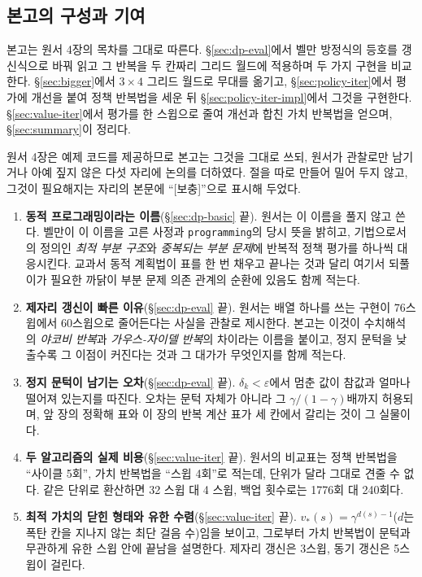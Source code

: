 \documentclass[11pt,a4paper]{article}
\begin{document}
\subsection*{본고의 구성과 기여}

본고는 원서 4장의 목차를 그대로 따른다. \S\ref{sec:dp-eval}에서 벨만 방정식의 등호를 갱신식으로
바꿔 읽고 그 반복을 두 칸짜리 그리드 월드에 적용하며 두 가지 구현을 비교한다.
\S\ref{sec:bigger}에서 $3\times4$ 그리드 월드로 무대를 옮기고, \S\ref{sec:policy-iter}에서 평가에
개선을 붙여 정책 반복법을 세운 뒤 \S\ref{sec:policy-iter-impl}에서 그것을 구현한다.
\S\ref{sec:value-iter}에서 평가를 한 스윕으로 줄여 개선과 합친 가치 반복법을 얻으며,
\S\ref{sec:summary}이 정리다.

원서 4장은 예제 코드를 제공하므로 본고는 그것을 그대로 쓰되, 원서가 관찰로만 남기거나 아예 짚지 않은
다섯 자리에 논의를 더하였다. 절을 따로 만들어 밀어 두지 않고, 그것이 필요해지는 자리의 본문에
``[보충]''으로 표시해 두었다.

\begin{enumerate}[leftmargin=*,itemsep=2pt]
  \item \textbf{동적 프로그래밍이라는 이름}(\S\ref{sec:dp-basic} 끝). 원서는 이 이름을 풀지 않고
        쓴다. 벨만이 이 이름을 고른 사정과 \texttt{programming}의 당시 뜻을 밝히고, 기법으로서의
        정의인 \emph{최적 부분 구조}와 \emph{중복되는 부분 문제}에 반복적 정책 평가를 하나씩
        대응시킨다. 교과서 동적 계획법이 표를 한 번 채우고 끝나는 것과 달리 여기서 되풀이가 필요한
        까닭이 부분 문제 의존 관계의 순환에 있음도 함께 적는다.
  \item \textbf{제자리 갱신이 빠른 이유}(\S\ref{sec:dp-eval} 끝). 원서는 배열 하나를 쓰는 구현이
        $76$스윕에서 $60$스윕으로 줄어든다는 사실을 관찰로 제시한다. 본고는 이것이 수치해석의
        \emph{야코비 반복}과 \emph{가우스-자이델 반복}의 차이라는 이름을 붙이고, 정지 문턱을 낮출수록
        그 이점이 커진다는 것과 그 대가가 무엇인지를 함께 적는다.
  \item \textbf{정지 문턱이 남기는 오차}(\S\ref{sec:dp-eval} 끝). $\delta_k<\varepsilon$에서 멈춘 값이
        참값과 얼마나 떨어져 있는지를 따진다. 오차는 문턱 자체가 아니라 그 $\gamma/(1-\gamma)$배까지
        허용되며, 앞 장의 정확해 표와 이 장의 반복 계산 표가 세 칸에서 갈리는 것이 그 실물이다.
  \item \textbf{두 알고리즘의 실제 비용}(\S\ref{sec:value-iter} 끝). 원서의 비교표는 정책 반복법을
        ``사이클 5회'', 가치 반복법을 ``스윕 4회''로 적는데, 단위가 달라 그대로 견줄 수 없다. 같은
        단위로 환산하면 32 스윕 대 4 스윕, 백업 횟수로는 1776회 대 240회다.
  \item \textbf{최적 가치의 닫힌 형태와 유한 수렴}(\S\ref{sec:value-iter} 끝).
        $v_*(s)=\gamma^{d(s)-1}$($d$는 폭탄 칸을 지나지 않는 최단 걸음 수)임을 보이고, 그로부터
        가치 반복법이 문턱과 무관하게 유한 스윕 안에 끝남을 설명한다. 제자리 갱신은 3스윕,
        동기 갱신은 5스윕이 걸린다.
\end{enumerate}
\end{document}
